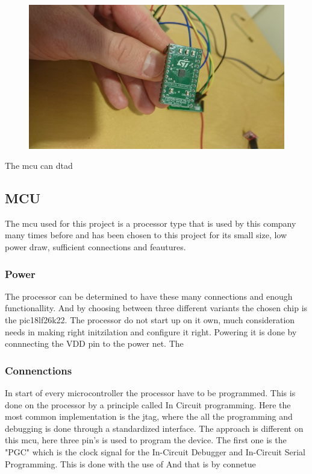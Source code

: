 \begin{figure}[H] 
\centering 
\includegraphics[width=.8\linewidth]{Figures/DSC_0103} 
\label{rattbo} 
\end{figure} 

The \gls{mcu} can dtad

\subsection{MCU}
The \gls{mcu} used for this project is a processor type that is used by this company many times before and has been chosen to this project for its small size, low power draw, sufficient connections and feautures. 
\subsubsection{Power}
The processor can be determined to have these many connections and enough functionallity. And by choosing between three different variants the chosen chip is the pic18lf26k22\cite{pic18}.
The processor do not start up on it own, much consideration needs in making right initzilation and configure it right. Powering it is done by connnecting the VDD pin to the power net. The

\subsubsection{Connenctions}
In start of every microcontroller the processor have to be programmed. This is done on the processor by a principle called In Circuit programming\cite{}. Here the most common implementation is the \gls{jtag}, where the all the programming and debugging is done through a standardized interface. The approach is different on this \gls{mcu}, here three pin's is used to program the device. The first one is the "PGC" which is the clock signal for the In-Circuit Debugger and In-Circuit Serial Programming. This is done with the use of 
And that is by connetue

